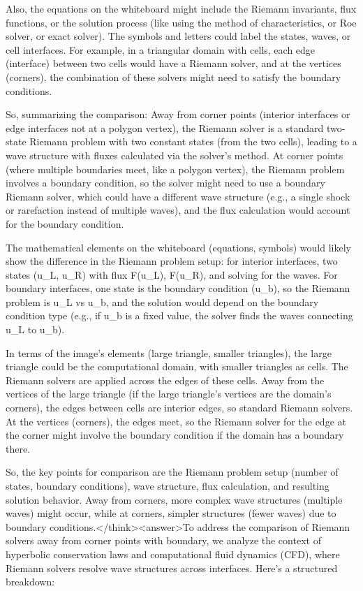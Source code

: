 Also, the equations on the whiteboard might include the Riemann invariants, flux functions, or the solution process (like using the method of characteristics, or Roe solver, or exact solver). The symbols and letters could label the states, waves, or cell interfaces. For example, in a triangular domain with cells, each edge (interface) between two cells would have a Riemann solver, and at the vertices (corners), the combination of these solvers might need to satisfy the boundary conditions.

So, summarizing the comparison: Away from corner points (interior interfaces or edge interfaces not at a polygon vertex), the Riemann solver is a standard two-state Riemann problem with two constant states (from the two cells), leading to a wave structure with fluxes calculated via the solver's method. At corner points (where multiple boundaries meet, like a polygon vertex), the Riemann problem involves a boundary condition, so the solver might need to use a boundary Riemann solver, which could have a different wave structure (e.g., a single shock or rarefaction instead of multiple waves), and the flux calculation would account for the boundary condition.

The mathematical elements on the whiteboard (equations, symbols) would likely show the difference in the Riemann problem setup: for interior interfaces, two states (u_L, u_R) with flux F(u_L), F(u_R), and solving for the waves. For boundary interfaces, one state is the boundary condition (u_b), so the Riemann problem is u_L vs u_b, and the solution would depend on the boundary condition type (e.g., if u_b is a fixed value, the solver finds the waves connecting u_L to u_b).

In terms of the image's elements (large triangle, smaller triangles), the large triangle could be the computational domain, with smaller triangles as cells. The Riemann solvers are applied across the edges of these cells. Away from the vertices of the large triangle (if the large triangle's vertices are the domain's corners), the edges between cells are interior edges, so standard Riemann solvers. At the vertices (corners), the edges meet, so the Riemann solver for the edge at the corner might involve the boundary condition if the domain has a boundary there.

So, the key points for comparison are the Riemann problem setup (number of states, boundary conditions), wave structure, flux calculation, and resulting solution behavior. Away from corners, more complex wave structures (multiple waves) might occur, while at corners, simpler structures (fewer waves) due to boundary conditions.</think><answer>To address the comparison of Riemann solvers away from corner points with boundary, we analyze the context of hyperbolic conservation laws and computational fluid dynamics (CFD), where Riemann solvers resolve wave structures across interfaces. Here’s a structured breakdown:  



